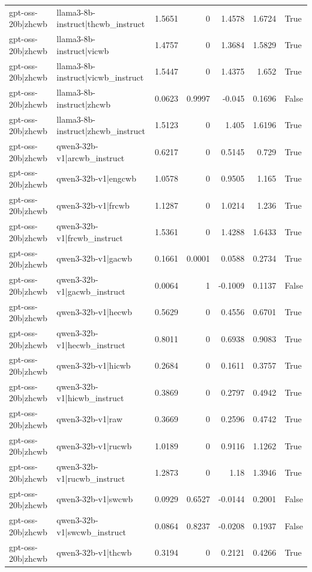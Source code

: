 \begin{table}
\begin{tabular}{l l r r r r l}
gpt-oss-20b|zhcwb & llama3-8b-instruct|thcwb_instruct & 1.5651 & 0 & 1.4578 & 1.6724 & True \\
gpt-oss-20b|zhcwb & llama3-8b-instruct|vicwb & 1.4757 & 0 & 1.3684 & 1.5829 & True \\
gpt-oss-20b|zhcwb & llama3-8b-instruct|vicwb_instruct & 1.5447 & 0 & 1.4375 & 1.652 & True \\
gpt-oss-20b|zhcwb & llama3-8b-instruct|zhcwb & 0.0623 & 0.9997 & -0.045 & 0.1696 & False \\
gpt-oss-20b|zhcwb & llama3-8b-instruct|zhcwb_instruct & 1.5123 & 0 & 1.405 & 1.6196 & True \\
gpt-oss-20b|zhcwb & qwen3-32b-v1|arcwb_instruct & 0.6217 & 0 & 0.5145 & 0.729 & True \\
gpt-oss-20b|zhcwb & qwen3-32b-v1|engcwb & 1.0578 & 0 & 0.9505 & 1.165 & True \\
gpt-oss-20b|zhcwb & qwen3-32b-v1|frcwb & 1.1287 & 0 & 1.0214 & 1.236 & True \\
gpt-oss-20b|zhcwb & qwen3-32b-v1|frcwb_instruct & 1.5361 & 0 & 1.4288 & 1.6433 & True \\
gpt-oss-20b|zhcwb & qwen3-32b-v1|gacwb & 0.1661 & 0.0001 & 0.0588 & 0.2734 & True \\
gpt-oss-20b|zhcwb & qwen3-32b-v1|gacwb_instruct & 0.0064 & 1 & -0.1009 & 0.1137 & False \\
gpt-oss-20b|zhcwb & qwen3-32b-v1|hecwb & 0.5629 & 0 & 0.4556 & 0.6701 & True \\
gpt-oss-20b|zhcwb & qwen3-32b-v1|hecwb_instruct & 0.8011 & 0 & 0.6938 & 0.9083 & True \\
gpt-oss-20b|zhcwb & qwen3-32b-v1|hicwb & 0.2684 & 0 & 0.1611 & 0.3757 & True \\
gpt-oss-20b|zhcwb & qwen3-32b-v1|hicwb_instruct & 0.3869 & 0 & 0.2797 & 0.4942 & True \\
gpt-oss-20b|zhcwb & qwen3-32b-v1|raw & 0.3669 & 0 & 0.2596 & 0.4742 & True \\
gpt-oss-20b|zhcwb & qwen3-32b-v1|rucwb & 1.0189 & 0 & 0.9116 & 1.1262 & True \\
gpt-oss-20b|zhcwb & qwen3-32b-v1|rucwb_instruct & 1.2873 & 0 & 1.18 & 1.3946 & True \\
gpt-oss-20b|zhcwb & qwen3-32b-v1|swcwb & 0.0929 & 0.6527 & -0.0144 & 0.2001 & False \\
gpt-oss-20b|zhcwb & qwen3-32b-v1|swcwb_instruct & 0.0864 & 0.8237 & -0.0208 & 0.1937 & False \\
gpt-oss-20b|zhcwb & qwen3-32b-v1|thcwb & 0.3194 & 0 & 0.2121 & 0.4266 & True \\

\end{tabular}
\end{table}
